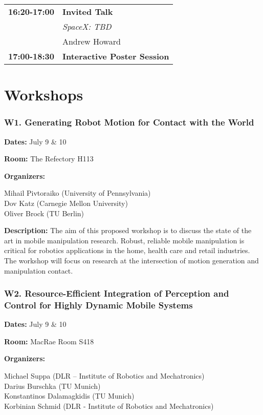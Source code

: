 \begin{tabular}{lp{13.8cm}}
{\bf 16:20-17:00} & {\bf Invited Talk} \\[2mm]
& \em{ SpaceX: TBD}\\
& Andrew Howard\\[2mm]

{\bf 17:00-18:30} & {\bf Interactive Poster Session} \\[2mm]

\end{tabular}


\newpage
\section*{Workshops}
\label{workshops}
\subsubsection*{W1.  Generating Robot Motion for Contact with the World}

{\bf Dates:} July 9 \& 10

{\bf Room:} The Refectory H113

\bigskip
{\bf Organizers:}

Mihail Pivtoraiko (University of Pennsylvania) \\
Dov Katz (Carnegie Mellon University)\\
Oliver Brock (TU Berlin)

\bigskip
{\bf Description:}
The aim of this proposed workshop is to discuss the state of the art in mobile manipulation research. Robust, reliable mobile manipulation is critical for robotics applications in the home, health care and retail industries. The workshop will focus on research at the intersection of motion generation and manipulation contact.




\subsubsection*{W2.  Resource-Efficient Integration of Perception and Control for Highly Dynamic Mobile Systems}

{\bf Dates:} July 9 \& 10

{\bf Room:} MacRae Room S418

\bigskip
{\bf Organizers:}

Michael Suppa (DLR – Institute of Robotics and Mechatronics)\\
Darius Burschka (TU Munich)\\
Konstantinos Dalamagkidis (TU Munich)\\
Korbinian Schmid (DLR - Institute of Robotics and Mechatronics)

